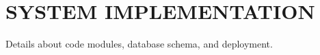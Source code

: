 \chapter{SYSTEM IMPLEMENTATION}
\label{ch:implementation}

Details about code modules, database schema, and deployment.
